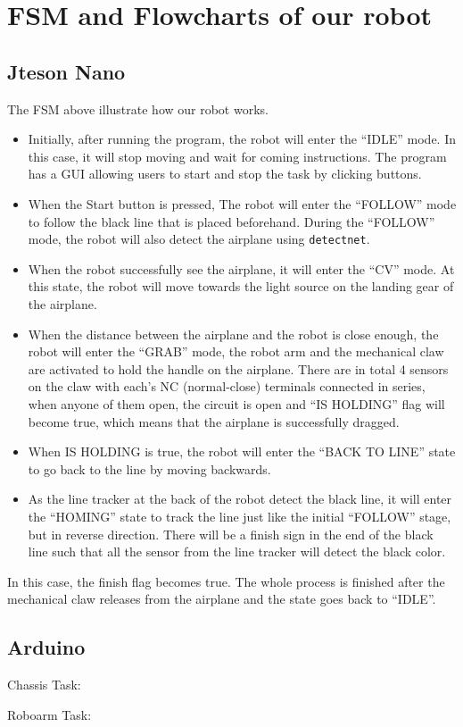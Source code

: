 \section{FSM and Flowcharts of our robot}{

% 

\subsection{Jteson Nano}{

The FSM above illustrate how our robot works. 
\begin{itemize}
    \item 
    Initially, after running the program, the robot will enter the ``IDLE'' mode. In this case, it will stop moving and wait for coming instructions. The program has a GUI allowing users to start and stop the task by clicking buttons. 
    \item 
    When the Start button is pressed, The robot will enter the ``FOLLOW'' mode to follow the black line that is placed beforehand. During the ``FOLLOW'' mode, the robot will also detect the airplane using \lstinline|detectnet|. 
    \item 
    When the robot successfully see the airplane, it will enter the ``CV'' mode. At this state, the robot will  move towards the light source on the landing gear of the airplane. 
    \item 
    When the distance between the airplane and the robot is close enough, the robot will enter the ``GRAB'' mode, the robot arm and the mechanical claw are activated to hold the handle on the airplane. 
    There are in total 4 sensors on the claw with each's NC (normal-close) terminals connected in series, when anyone of them open, the circuit is open and ``IS HOLDING'' flag will become true, which means that the airplane is successfully dragged. 
    \item 
    When IS HOLDING is true, the robot will enter the ``BACK TO LINE'' state to go back to the line by moving backwards. 
    \item 
    As the line tracker at the back of the robot detect the black line, it will enter the ``HOMING'' state to track the line just like the initial ``FOLLOW'' stage, but in reverse direction. There will be a finish sign in the end of the black line such that all the sensor from the line tracker will detect the black color. 
    
\end{itemize}

In this case, the finish flag becomes true. The whole process is finished after the mechanical claw releases  from the airplane and the state goes back to ``IDLE''.
}
}
\subsection{Arduino}{
Chassis Task:

\newpage
Roboarm Task:

}
